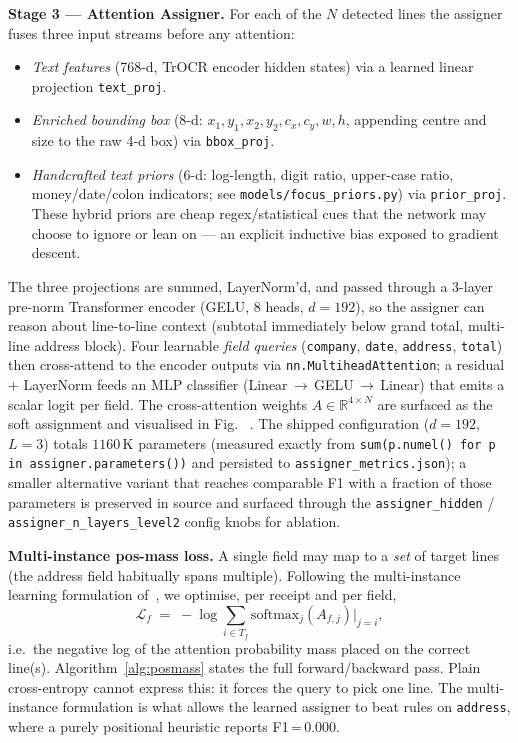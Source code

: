 \documentclass[conference]{IEEEtran}
\makeatletter
\newcommand{\figref}[1]{%
  \@ifundefined{r@#1}{\textit{[figure absent]}}{\ref{#1}}%
}
\makeatother
\begin{document}
\textbf{Stage 3 --- Attention Assigner.}
For each of the $N$ detected lines the assigner fuses three input
streams before any attention:
\begin{itemize}
\item \emph{Text features} (768-d, TrOCR encoder hidden states) via a
      learned linear projection \texttt{text\_proj}.
\item \emph{Enriched bounding box} (8-d: $x_1,y_1,x_2,y_2,c_x,c_y,w,h$,
      appending centre and size to the raw 4-d box) via \texttt{bbox\_proj}.
\item \emph{Handcrafted text priors} (6-d: log-length, digit ratio,
      upper-case ratio, money/date/colon indicators; see
      \texttt{models/focus\_priors.py}) via \texttt{prior\_proj}.
      These hybrid priors are cheap regex/statistical cues that the
      network may choose to ignore or lean on --- an explicit inductive
      bias exposed to gradient descent.
\end{itemize}
The three projections are summed, LayerNorm'd, and passed through a
$3$-layer pre-norm Transformer encoder
(GELU, 8 heads, $d{=}192$), so the assigner can
reason about line-to-line context (subtotal immediately below grand
total, multi-line address block).  Four learnable
\emph{field queries} (\texttt{company}, \texttt{date}, \texttt{address},
\texttt{total}) then cross-attend to the encoder outputs via
\texttt{nn.MultiheadAttention}; a residual + LayerNorm feeds an MLP
classifier (Linear\,$\to$\,GELU\,$\to$\,Linear) that emits a scalar
logit per field.  The cross-attention weights
$A \in \mathbb{R}^{4\times N}$ are surfaced as the soft assignment and
visualised in Fig.~\figref{fig:attn_heatmap}.
The shipped configuration ($d{=}192$,
$L{=}3$) totals
$1160$\,K parameters
(measured exactly from \texttt{sum(p.numel() for p in
assigner.parameters())} and persisted to
\texttt{assigner\_metrics.json}); a smaller alternative variant
that reaches comparable F1 with a fraction of those parameters is preserved
in source and surfaced through the \texttt{assigner\_hidden} /
\texttt{assigner\_n\_layers\_level2} config knobs for ablation.

\textbf{Multi-instance pos-mass loss.}
A single field may map to a \emph{set} of target lines (the address
field habitually spans multiple).  Following the multi-instance
learning formulation of~\cite{dietterich1997mil,ilse2018mil}, we
optimise, per receipt and per field,
\[
  \mathcal{L}_f \;=\; -\log \sum_{i \in T_f}
                   \mathrm{softmax}_j(A_{f,j})\big|_{j=i},
\]
i.e.\ the negative log of the attention probability mass placed on
the correct line(s).  Algorithm~\ref{alg:posmass} states the full
forward/backward pass.  Plain cross-entropy cannot express this: it
forces the query to pick one line.  The multi-instance formulation
is what allows the learned assigner to beat rules on
\texttt{address}, where a purely positional heuristic reports
F1\,=\,0.000.
\end{document}
